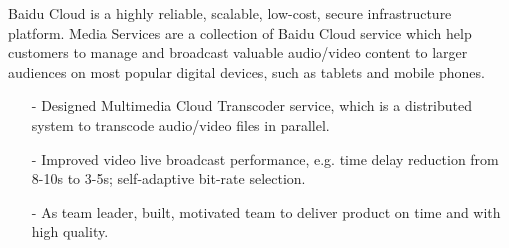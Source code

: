 \documentclass[10pt,a4paper]{moderncv}
\begin{document}
{
	 Baidu Cloud is a highly reliable, scalable, low-cost, secure infrastructure platform.
	 Media Services are a collection of Baidu Cloud service which help customers to manage and broadcast valuable audio/video content to larger audiences on most popular digital devices, such as tablets and mobile phones.
	 \begin{itemize}
		\item[-] Designed Multimedia Cloud Transcoder service, which is a distributed system to transcode audio/video files in parallel.
		\item[-] Improved video live broadcast performance, e.g. time delay reduction from 8-10s to 3-5s; self-adaptive bit-rate selection.
		\item[-] As team leader, built, motivated team to deliver product on time and with high quality.
	 \end{itemize}
}

%
%
%
%
%

%
%




\vspace{2ex}
\end{document}
